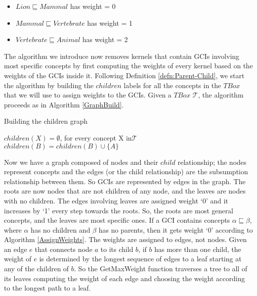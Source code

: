 \begin{itemize}
\item $Lion \sqsubseteq Mammal$ has weight = 0
\item $Mammal \sqsubseteq Vertebrate$ has weight = 1
\item $Vertebrate \sqsubseteq Animal$ has weight = 2
\end{itemize}

The algorithm we introduce now removes kernels that contain GCIs involving most specific concepts by first computing the weights of every kernel based on the weights of the GCIs inside it. Following Definition \ref{defn:Parent-Child}, we start the algorithm by building the $children$ labels for all the concepts in the $TBox$ that we will use to assign weights to the GCIs. Given a $TBox$ $\mathcal{T}$, the algorithm proceeds as in Algorithm \ref{GraphBuild}.

\begin{algorithm}
\caption{Building the children graph}
\label{GraphBuild}
\begin{algorithmic}[1]
\State $children(X) = \emptyset$, for every concept X in$\mathcal{T}$
\State $children(B) = children(B) \cup \{ A \}$
\EndFor
\EndFunction
\end{algorithmic}
\end{algorithm}

Now we have a graph composed of nodes and their $child$ relationship; the nodes represent concepts and the edges (or the child relationship) are the subsumption relationship between them. So GCIs are represented by edges in the graph. The roots are now nodes that are not children of any node, and the leaves are nodes with no children. The edges involving leaves are assigned weight `0' and it increases by `1' every step towards the roots. So, the roots are most general concepts, and the leaves are most specific ones. If a GCI contains concepts $\alpha \sqsubseteq \beta$, where $\alpha$ has no children and $\beta$ has no parents, then it gets weight `0' according to Algorithm \ref{AssignWeights}. The weights are assigned to edges, not nodes. Given an edge $e$ that connects node $a$ to its child $b$, if $b$ has more than one child, the weight of $e$ is determined by the longest sequence of edges to a leaf starting at any of the children of $b$. So the GetMaxWeight function traverses a tree to all of its leaves computing the weight of each edge and choosing the weight according to the longest path to a leaf.

